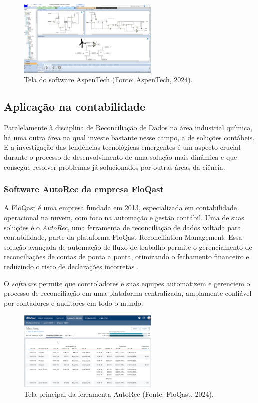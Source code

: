 \begin{figure}[htbp!] 
    \centering
    \includegraphics[width=0.6\textwidth]{figuras/aspen-aspentech.png}
    \caption{Tela do software AspenTech (Fonte: AspenTech, 2024).}
    \label{fig:AspenTech}
\end{figure}


\subsection{Aplicação na contabilidade}

Paralelamente à disciplina de Reconciliação de Dados na área industrial química, há uma outra área na qual investe bastante nesse campo, a de soluções contábeis. E a investigação das tendências tecnológicas emergentes é um aspecto crucial durante o processo de desenvolvimento de uma solução mais dinâmica e que consegue resolver problemas já solucionados por outras áreas da ciência.

\subsubsection{Software AutoRec da empresa FloQast}

A FloQast é uma empresa fundada em 2013, especializada em contabilidade operacional na nuvem, com foco na automação e gestão contábil. Uma de suas soluções é o \textit{AutoRec}, uma ferramenta de reconciliação de dados voltada para contabilidade, parte da plataforma FloQast Reconciliation Management. Essa solução avançada de automação de fluxo de trabalho permite o gerenciamento de reconciliações de contas de ponta a ponta, otimizando o fechamento financeiro e reduzindo o risco de declarações incorretas \cite{floqast}.

O \textit{software} permite que controladores e suas equipes automatizem e gerenciem o processo de reconciliação em uma plataforma centralizada, amplamente confiável por contadores e auditores em todo o mundo.

\begin{figure}[htbp!] 
    \centering
    \includegraphics[width=0.6\textwidth]{figuras/floqast-autorec.png}
    \caption{Tela principal da ferramenta AutoRec (Fonte: FloQast, 2024).}
    \label{fig:AutoRec}
\end{figure}

